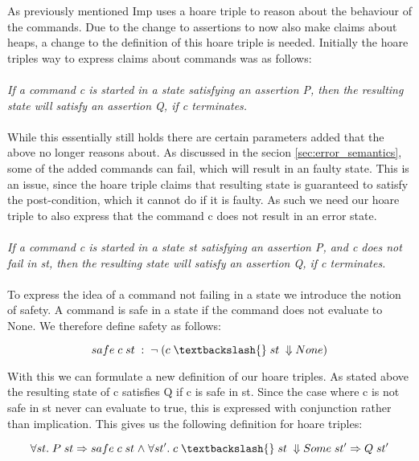 As previously mentioned Imp uses a hoare triple to reason about the behaviour of the commands. Due to the change to assertions to now also make claims about heaps, a change to the definition of this hoare triple is needed. Initially the hoare triples way to express claims about commands was as follows:
\\
\\
\textit{If a command c is started in a state satisfying an assertion P, then the resulting state will satisfy an assertion Q, if c terminates.}
\\
\\
While this essentially still holds there are certain parameters added that the above no longer reasons about. As discussed in the secion \ref{sec:error_semantics}, some of the added commands can fail, which will result in an faulty state. This is an issue, since the hoare triple claims that resulting state is guaranteed to satisfy the post-condition, which it cannot do if it is faulty. As such we need our hoare triple to also express that the command c does not result in an error state.
\\
\\
\textit{If a command c is started in a state st satisfying an assertion P, and c does not fail in st, then the resulting state will satisfy an assertion Q, if c terminates.}
\\
\\

To express the idea of a command not failing in a state we introduce the notion of safety. A command is safe in a state if the command does not evaluate to None. We therefore  define safety as follows:

\[safe\;c\;st\;: \;\neg \;(c \;\textbackslash{}\;st\;\Downarrow None)\]

With this we can formulate a new definition of our hoare triples. As stated above the resulting state of c satisfies Q if c is safe in st. Since the case where c is not safe in st never can evaluate to true, this is expressed with conjunction rather than implication. This gives us the following definition for hoare triples:

\[
\forall st.\; P\;st \impl safe\;c\;st \land \forall st'. \;c\;\textbackslash{}\;st\;\Downarrow Some\; st' \impl Q\;st'
\]	